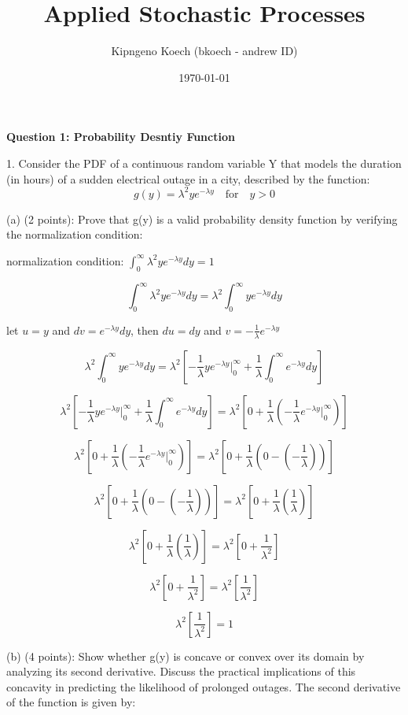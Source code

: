 \documentclass{article}
\title{Applied Stochastic Processes}
\author{Kipngeno Koech (bkoech - andrew ID)}
\date{\today}
\begin{document}
\maketitle
\begin{center}
    \large \textbf{Question 1: Probability Desntiy Function}
\end{center}

1. Consider the PDF of a continuous random variable Y that models the duration (in hours) of a
sudden electrical outage in a city, described by the function:
\[g(y) = \lambda^2ye^{-\lambda y} \quad \text{for} \quad y > 0\]

(a) (2 points): Prove that g(y) is a valid probability density function by verifying the normalization
condition:\newline

normalization condition: \(\int_{0}^{\infty}\lambda^2ye^{-\lambda y}dy = 1\)

\[\int_{0}^{\infty}\lambda^2ye^{-\lambda y}dy = \lambda^2\int_{0}^{\infty}ye^{-\lambda y}dy\]

let \(u = y\) and \(dv = e^{-\lambda y}dy\), then \(du = dy\) and \(v = -\frac{1}{\lambda}e^{-\lambda y}\)

\[\lambda^2\int_{0}^{\infty}ye^{-\lambda y}dy = \lambda^2\left[-\frac{1}{\lambda}ye^{-\lambda y}\Big|_{0}^{\infty} + \frac{1}{\lambda}\int_{0}^{\infty}e^{-\lambda y}dy\right]\]

\[\lambda^2\left[-\frac{1}{\lambda}ye^{-\lambda y}\Big|_{0}^{\infty} + \frac{1}{\lambda}\int_{0}^{\infty}e^{-\lambda y}dy\right] = \lambda^2\left[0 + \frac{1}{\lambda}\left(-\frac{1}{\lambda}e^{-\lambda y}\Big|_{0}^{\infty}\right)\right]\]

\[\lambda^2\left[0 + \frac{1}{\lambda}\left(-\frac{1}{\lambda}e^{-\lambda y}\Big|_{0}^{\infty}\right)\right] = \lambda^2\left[0 + \frac{1}{\lambda}\left(0 - (-\frac{1}{\lambda})\right)\right]\]

\[\lambda^2\left[0 + \frac{1}{\lambda}\left(0 - (-\frac{1}{\lambda})\right)\right] = \lambda^2\left[0 + \frac{1}{\lambda}\left(\frac{1}{\lambda}\right)\right]\]

\[\lambda^2\left[0 + \frac{1}{\lambda}\left(\frac{1}{\lambda}\right)\right] = \lambda^2\left[0 + \frac{1}{\lambda^2}\right]\]

\[\lambda^2\left[0 + \frac{1}{\lambda^2}\right] = \lambda^2\left[\frac{1}{\lambda^2}\right]\]

\[\lambda^2\left[\frac{1}{\lambda^2}\right] = 1\]

(b) (4 points): Show whether g(y) is concave or convex over its domain by analyzing its second
derivative. Discuss the practical implications of this concavity in predicting the likelihood of
prolonged outages.\newline
The second derivative of the function is given by:
\end{document}
